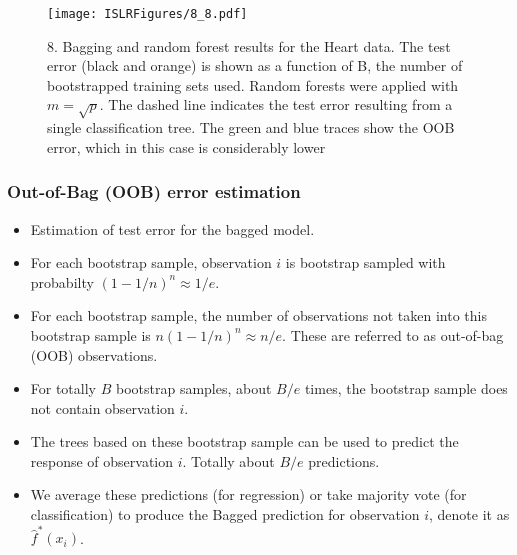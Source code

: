 \documentclass{beamer}
\begin{document}
               
                 \begin{frame}
                 	\frametitle{ }
                 	\begin{figure}
                 		\centering
                 		
                 		\centering
                 		\texttt{[image: ISLRFigures/8\_8.pdf]}
                 		\caption{\scriptsize 8. Bagging and random forest results for the Heart data. The test
                 			error (black and orange) is shown as a function of B, the number of bootstrapped
                 			training sets used. Random forests were applied with $m = \sqrt{p}$.  The dashed line
                 			indicates the test error resulting from a single classification tree. The green and
                 			blue traces show the OOB error, which in this case is considerably lower
                 		}
                 	\end{figure}
                 \end{frame}
                    \begin{frame}
                    	\frametitle{Out-of-Bag (OOB) error estimation  }
                    	\begin{itemize}
                    		\item  Estimation of test error for the bagged model.	
                    		
                    		\item  For each bootstrap sample, observation $i$ is bootstrap sampled with probabilty $(1-1/n)^n \approx 1/e $.
                    		\item   For each bootstrap sample,  the number of observations not taken into 
                    		 this bootstrap sample is $n (1-1/n)^n \approx n/e$. These are referred to 
                    		 as out-of-bag (OOB) observations.
                    		\item For totally $B$ bootstrap samples, about $B/e$ times, the bootstrap sample does not contain observation $i$.
                    		\item  The trees based on these bootstrap sample can be used to predict the response of 
                    		observation $i$.
                    		Totally about $B/e$ predictions.
                    		\item We average these predictions (for regression) or take majority vote (for classification) to produce the Bagged prediction for observation $i$, denote it as $\hat f^*(x_i)$. 
                    		
                    		
                    	\end{itemize}
                    \end{frame} 
\end{document}
